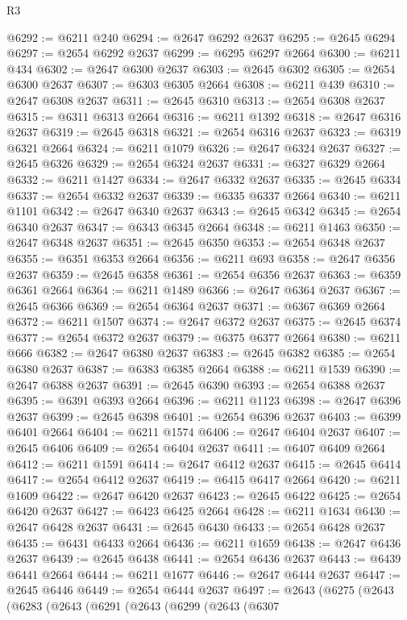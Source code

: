 \begin{lexlean}{R3}
\begin{coremodule}
@6292 := @6211 @240
@6294 := @2647 @6292 @2637
@6295 := @2645 @6294
@6297 := @2654 @6292 @2637
@6299 := @6295 @6297 @2664
@6300 := @6211 @434
@6302 := @2647 @6300 @2637
@6303 := @2645 @6302
@6305 := @2654 @6300 @2637
@6307 := @6303 @6305 @2664
@6308 := @6211 @439
@6310 := @2647 @6308 @2637
@6311 := @2645 @6310
@6313 := @2654 @6308 @2637
@6315 := @6311 @6313 @2664
@6316 := @6211 @1392
@6318 := @2647 @6316 @2637
@6319 := @2645 @6318
@6321 := @2654 @6316 @2637
@6323 := @6319 @6321 @2664
@6324 := @6211 @1079
@6326 := @2647 @6324 @2637
@6327 := @2645 @6326
@6329 := @2654 @6324 @2637
@6331 := @6327 @6329 @2664
@6332 := @6211 @1427
@6334 := @2647 @6332 @2637
@6335 := @2645 @6334
@6337 := @2654 @6332 @2637
@6339 := @6335 @6337 @2664
@6340 := @6211 @1101
@6342 := @2647 @6340 @2637
@6343 := @2645 @6342
@6345 := @2654 @6340 @2637
@6347 := @6343 @6345 @2664
@6348 := @6211 @1463
@6350 := @2647 @6348 @2637
@6351 := @2645 @6350
@6353 := @2654 @6348 @2637
@6355 := @6351 @6353 @2664
@6356 := @6211 @693
@6358 := @2647 @6356 @2637
@6359 := @2645 @6358
@6361 := @2654 @6356 @2637
@6363 := @6359 @6361 @2664
@6364 := @6211 @1489
@6366 := @2647 @6364 @2637
@6367 := @2645 @6366
@6369 := @2654 @6364 @2637
@6371 := @6367 @6369 @2664
@6372 := @6211 @1507
@6374 := @2647 @6372 @2637
@6375 := @2645 @6374
@6377 := @2654 @6372 @2637
@6379 := @6375 @6377 @2664
@6380 := @6211 @666
@6382 := @2647 @6380 @2637
@6383 := @2645 @6382
@6385 := @2654 @6380 @2637
@6387 := @6383 @6385 @2664
@6388 := @6211 @1539
@6390 := @2647 @6388 @2637
@6391 := @2645 @6390
@6393 := @2654 @6388 @2637
@6395 := @6391 @6393 @2664
@6396 := @6211 @1123
@6398 := @2647 @6396 @2637
@6399 := @2645 @6398
@6401 := @2654 @6396 @2637
@6403 := @6399 @6401 @2664
@6404 := @6211 @1574
@6406 := @2647 @6404 @2637
@6407 := @2645 @6406
@6409 := @2654 @6404 @2637
@6411 := @6407 @6409 @2664
@6412 := @6211 @1591
@6414 := @2647 @6412 @2637
@6415 := @2645 @6414
@6417 := @2654 @6412 @2637
@6419 := @6415 @6417 @2664
@6420 := @6211 @1609
@6422 := @2647 @6420 @2637
@6423 := @2645 @6422
@6425 := @2654 @6420 @2637
@6427 := @6423 @6425 @2664
@6428 := @6211 @1634
@6430 := @2647 @6428 @2637
@6431 := @2645 @6430
@6433 := @2654 @6428 @2637
@6435 := @6431 @6433 @2664
@6436 := @6211 @1659
@6438 := @2647 @6436 @2637
@6439 := @2645 @6438
@6441 := @2654 @6436 @2637
@6443 := @6439 @6441 @2664
@6444 := @6211 @1677
@6446 := @2647 @6444 @2637
@6447 := @2645 @6446
@6449 := @2654 @6444 @2637
@6497 := @2643
    (@6275
      (@2643
        (@6283
          (@2643
            (@6291
              (@2643
                (@6299
                  (@2643
                    (@6307

\end{coremodule}
\end{lexlean}
